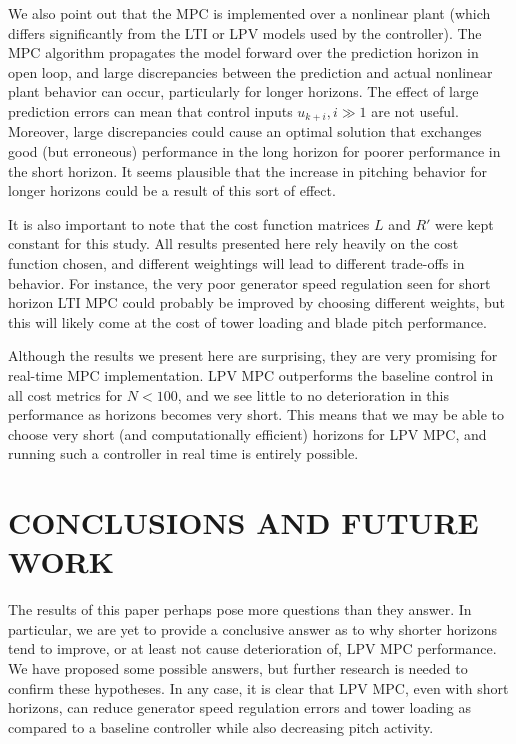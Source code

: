 \documentclass[letterpaper, 10 pt, conference]{ieeeconf}  %
\begin{document}
We also point out that the MPC is implemented over a nonlinear plant (which differs significantly from the LTI or LPV models used by the controller). The MPC algorithm propagates the model forward over the prediction horizon in open loop, and large discrepancies between the prediction and actual nonlinear plant behavior can occur, particularly for longer horizons. The effect of large prediction errors can mean that control inputs $u_{k+i}, i \gg 1$ are not useful. Moreover, large discrepancies could cause an optimal solution that exchanges good (but erroneous) performance in the long horizon for poorer performance in the short horizon. It seems plausible that the increase in pitching behavior for longer horizons could be a result of this sort of effect.

It is also important to note that the cost function matrices $L$ and $R'$ were kept constant for this study. All results presented here rely heavily on the cost function chosen, and different weightings will lead to different trade-offs in behavior. For instance, the very poor generator speed regulation seen for short horizon LTI MPC could probably be improved by choosing different weights, but this will likely come at the cost of tower loading and blade pitch performance.

Although the results we present here are surprising, they are very promising for real-time MPC implementation. LPV MPC outperforms the baseline control in all cost metrics for $N < 100$, and we see little to no deterioration in this performance as horizons becomes very short. This means that we may be able to choose very short (and computationally efficient) horizons for LPV MPC, and running such a controller in real time is entirely possible.

\section{CONCLUSIONS AND FUTURE WORK}\label{sec:Concl}

The results of this paper perhaps pose more questions than they answer. In particular, we are yet to provide a conclusive answer as to why shorter horizons tend to improve, or at least not cause deterioration of, LPV MPC performance. We have proposed some possible answers, but further research is needed to confirm these hypotheses. In any case, it is clear that LPV MPC, even with short horizons, can reduce generator speed regulation errors and tower loading as compared to a baseline controller while also decreasing pitch activity.
\end{document}
